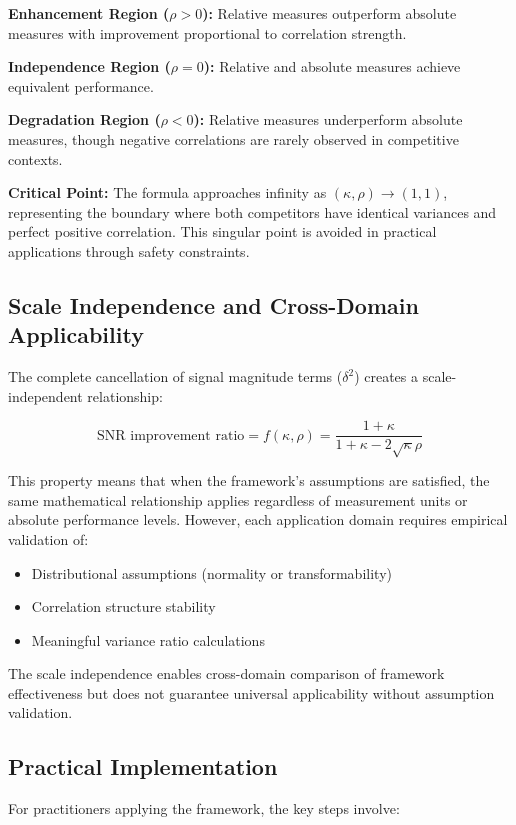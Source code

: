 \textbf{Enhancement Region ($\rho > 0$):} Relative measures outperform absolute measures with improvement proportional to correlation strength.

\textbf{Independence Region ($\rho = 0$):} Relative and absolute measures achieve equivalent performance.

\textbf{Degradation Region ($\rho < 0$):} Relative measures underperform absolute measures, though negative correlations are rarely observed in competitive contexts.

\textbf{Critical Point:} The formula approaches infinity as $(\kappa, \rho) \rightarrow (1, 1)$, representing the boundary where both competitors have identical variances and perfect positive correlation. This singular point is avoided in practical applications through safety constraints.

\subsection{Scale Independence and Cross-Domain Applicability}

The complete cancellation of signal magnitude terms ($\delta^2$) creates a scale-independent relationship:

$$\text{SNR improvement ratio} = f(\kappa, \rho) = \frac{1 + \kappa}{1 + \kappa - 2\sqrt{\kappa}\rho}$$

This property means that when the framework's assumptions are satisfied, the same mathematical relationship applies regardless of measurement units or absolute performance levels. However, each application domain requires empirical validation of:
\begin{itemize}
    \item Distributional assumptions (normality or transformability)
    \item Correlation structure stability
    \item Meaningful variance ratio calculations
\end{itemize}

The scale independence enables cross-domain comparison of framework effectiveness but does not guarantee universal applicability without assumption validation.

\subsection{Practical Implementation}

For practitioners applying the framework, the key steps involve:

